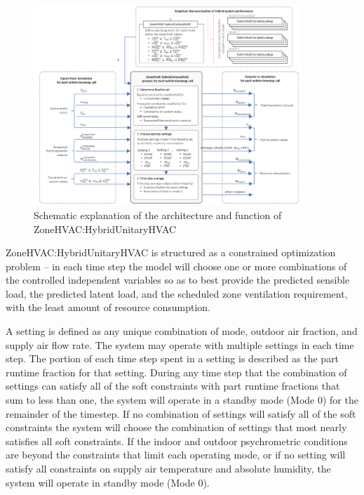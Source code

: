 \begin{figure}[hbtp]
\centering
\includegraphics[width=0.9\textwidth, height=0.9\textheight, keepaspectratio=true]{media/hybrid002.jpg}
\caption{Schematic explanation of the architecture and function of ZoneHVAC:HybridUnitaryHVAC \protect \label{fig:hybrid002}}
\end{figure}

ZoneHVAC:HybridUnitaryHVAC is structured as a constrained optimization problem – in each time step the model will choose one or more combinations of the controlled independent variables so as to best provide the predicted sensible load, the predicted latent load, and the scheduled zone ventilation requirement, with the least amount of resource consumption.

A setting is defined as any unique combination of mode, outdoor air fraction, and supply air flow rate. The system may operate with multiple settings in each time step. The portion of each time step spent in a setting is described as the part runtime fraction for that setting. During any time step that the combination of settings can satisfy all of the soft constraints with part runtime fractions that sum to less than one, the system will operate in a standby mode (Mode 0) for the remainder of the timestep. If no combination of settings will satisfy all of  the soft constraints the system will choose the combination of settings that most nearly satisfies all soft constraints. If the indoor and outdoor psychrometric conditions are beyond the constraints that limit each operating mode, or if no setting will satisfy all constraints on supply air temperature and absolute humidity, the system will operate in standby mode (Mode 0).

